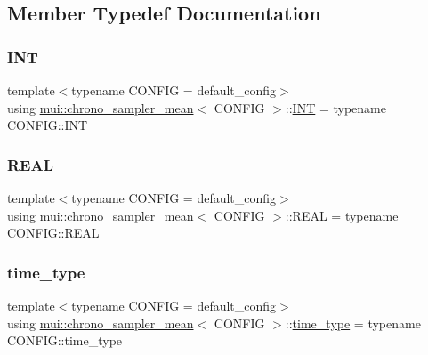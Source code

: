 \subsection{Member Typedef Documentation}
\mbox{\label{classmui_1_1chrono__sampler__mean_a2f7b78dba6112d39345f077008d2b453}} 
\subsubsection{\texorpdfstring{I\+NT}{INT}}
{\footnotesize\ttfamily template$<$typename C\+O\+N\+F\+IG  = default\+\_\+config$>$ \\
using \hyperlink{classmui_1_1chrono__sampler__mean}{mui\+::chrono\+\_\+sampler\+\_\+mean}$<$ C\+O\+N\+F\+IG $>$\+::\hyperlink{classmui_1_1chrono__sampler__mean_a2f7b78dba6112d39345f077008d2b453}{I\+NT} =  typename C\+O\+N\+F\+I\+G\+::\+I\+NT}

\mbox{\label{classmui_1_1chrono__sampler__mean_a31c93d26c0a7b8026ef9c3b0d0ddc5d2}} 
\subsubsection{\texorpdfstring{R\+E\+AL}{REAL}}
{\footnotesize\ttfamily template$<$typename C\+O\+N\+F\+IG  = default\+\_\+config$>$ \\
using \hyperlink{classmui_1_1chrono__sampler__mean}{mui\+::chrono\+\_\+sampler\+\_\+mean}$<$ C\+O\+N\+F\+IG $>$\+::\hyperlink{classmui_1_1chrono__sampler__mean_a31c93d26c0a7b8026ef9c3b0d0ddc5d2}{R\+E\+AL} =  typename C\+O\+N\+F\+I\+G\+::\+R\+E\+AL}

\mbox{\label{classmui_1_1chrono__sampler__mean_aa818a9c8850aa9fda611430c158a0072}} 
\subsubsection{\texorpdfstring{time\+\_\+type}{time\_type}}
{\footnotesize\ttfamily template$<$typename C\+O\+N\+F\+IG  = default\+\_\+config$>$ \\
using \hyperlink{classmui_1_1chrono__sampler__mean}{mui\+::chrono\+\_\+sampler\+\_\+mean}$<$ C\+O\+N\+F\+IG $>$\+::\hyperlink{classmui_1_1chrono__sampler__mean_aa818a9c8850aa9fda611430c158a0072}{time\+\_\+type} =  typename C\+O\+N\+F\+I\+G\+::time\+\_\+type}



